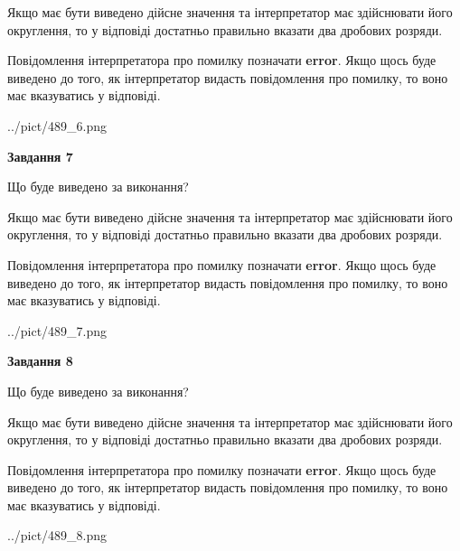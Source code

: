 \documentclass[12pt, ukrainian]{article}
\begin{document}
{\begin {Large}
Якщо має бути виведено дійсне значення та інтерпретатор має здійснювати його округлення, 
то у відповіді достатньо правильно вказати два дробових розряди.

Повідомлення інтерпретатора про помилку позначати \textbf{error}.
Якщо щось буде виведено до того, як інтерпретатор видасть повідомлення про помилку, 
то воно має вказуватись у відповіді. \par

\begin{center}
	{../pict/489_6.png}
\end{center}
\newpage

{\begin {center}\textbf{Завдання 7}\end {center}}\par
Що буде виведено за виконання? \par

Якщо має бути виведено дійсне значення та інтерпретатор має здійснювати його округлення, 
то у відповіді достатньо правильно вказати два дробових розряди.

Повідомлення інтерпретатора про помилку позначати \textbf{error}.
Якщо щось буде виведено до того, як інтерпретатор видасть повідомлення про помилку, 
то воно має вказуватись у відповіді. \par

\begin{center}
	{../pict/489_7.png}
\end{center}
\newpage

{\begin {center}\textbf{Завдання 8}\end {center}}\par
Що буде виведено за виконання? \par

Якщо має бути виведено дійсне значення та інтерпретатор має здійснювати його округлення, 
то у відповіді достатньо правильно вказати два дробових розряди.

Повідомлення інтерпретатора про помилку позначати \textbf{error}.
Якщо щось буде виведено до того, як інтерпретатор видасть повідомлення про помилку, 
то воно має вказуватись у відповіді. \par

\begin{center}
	{../pict/489_8.png}
\end{center}
\newpage


\end{Large}}
\end{document}
